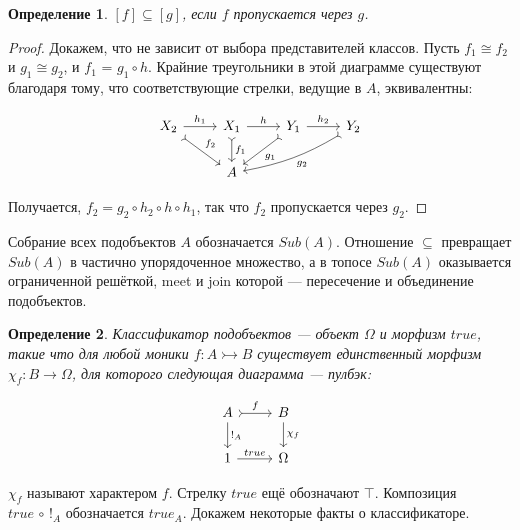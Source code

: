 \documentclass[a4paper, 12pt]{article}
\newtheorem{definition}{Определение}
\begin{document}
\begin{definition}
$[f]\subseteq [g]$, если $f$ пропускается через $g$.  
\end{definition}
\begin{proof}
Докажем, что не зависит от выбора представителей классов. Пусть $f_1\cong f_2$ и $g_1\cong g_2$, и $f_1$ = $g_1\circ h$. Крайние треугольники в этой диаграмме существуют благодаря тому, что соответствующие стрелки, ведущие в $A$, эквивалентны:

\[
\begin{tikzcd}
X_2 \arrow[tail]{dr}{f_2} \arrow{r}{h_1}
& X_1 \arrow[tail]{d}{f_1} \arrow{r}{h}
& Y_1 \arrow[tail]{dl}{g_1} \arrow{r}{h_2} 
& Y_2 \arrow[tail, bend left=10]{dll}{g_2} \\
& A
\end{tikzcd}
\]

Получается, $f_2 = g_2\circ h_2\circ h \circ h_1$, так что $f_2$ пропускается через $g_2$.
\end{proof}

Собрание всех подобъектов $A$ обозначается $Sub(A)$. Отношение $\subseteq$ превращает $Sub(A)$ в частично упорядоченное множество, а в топосе $Sub(A)$ оказывается ограниченной решёткой, meet и join которой --- пересечение и объединение подобъектов. 

\begin{definition}
Классификатор подобъектов --- объект $\Omega$ и морфизм $true$, такие что
для любой моники $f\colon A\rightarrowtail B$ существует единственный морфизм $\chi_f\colon B\to \Omega$, для которого следующая диаграмма --- пулбэк: 

\[
\begin{tikzcd}
A \arrow{d}{!_A} \arrow[tail]{r}{f}
& B \arrow{d}{\chi_f} \\
1 \arrow{r}{true}
& \Omega
\end{tikzcd}
\]

\end{definition}
$\chi_f$ называют характером $f$. Стрелку $true$ ещё обозначают $\top$. Композиция $true\,\circ\,!_A$ обозначается $true_A$. Докажем некоторые факты о классификаторе.
\end{document}
